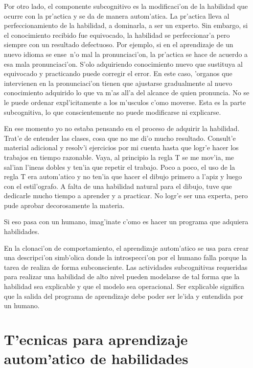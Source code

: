 \documentclass[11pt]{article}
\begin{document}
\medskip
Por otro lado, el componente subcognitivo es la modificaci'on de la habilidad que ocurre con la pr'actica y se da de manera autom'atica. La pr'actica lleva al perfeccionamiento de la habilidad, a dominarla, a ser un experto. Sin embargo, si el conocimiento recibido fue equivocado, la habilidad se perfeccionar'a pero siempre con un resultado defectuoso. Por ejemplo, si en el aprendizaje de un nuevo idioma se ense~n'o mal la pronunciaci'on, la pr'actica se hace de acuerdo a esa mala pronunciaci'on. S'olo adquiriendo conocimiento nuevo que sustituya al equivocado y practicando puede corregir el error. En este caso, 'organos que intervienen en la pronunciaci'on tienen que ajustarse gradualmente al nuevo conocimiento adquirido lo que va m'as all'a del alcance de quien pronuncia. No se le puede ordenar expl'icitamente a los m'usculos c'omo moverse. Esta es la parte subcognitiva, lo que conscientemente no puede modificarse ni explicarse.

\medskip
En ese momento yo no estaba pensando en el proceso de adquirir la habilidad. Trat'e de entender las clases, cosa que no me di'o mucho resultado. Consult'e material adicional y resolv'i ejercicios por mi cuenta hasta que logr'e hacer los trabajos en tiempo razonable. Vaya, al principio la regla T se me mov'ia, me sal'ian l'ineas dobles y ten'ia que repetir el trabajo. Poco a poco, el uso de la regla T era autom'atico y no ten'ia que hacer el dibujo primero a l'apiz y luego con el estil'ografo. A falta de una habilidad natural para el dibujo, tuve que dedicarle mucho tiempo a aprender y a practicar. No logr'e ser una experta, pero pude aprobar decorosamente la materia. 

\medskip
Si eso pasa con un humano, imag'inate c'omo es hacer un programa que adquiera habilidades.

\medskip
En la clonaci'on de comportamiento, el aprendizaje autom'atico se usa para crear una descripci'on simb'olica donde la introspecci'on por el humano falla porque la tarea de realiza de forma subconsciente. Las actividades subcognitivas requeridas para realizar una habilidad de alto nivel pueden modelarse de tal forma que la habilidad sea explicable y que el modelo sea operacional. Ser explicable significa que la salida del programa de aprendizaje debe poder ser le'ida y entendida por un humano.

\section {T'ecnicas para aprendizaje autom'atico de habilidades}
\end{document}
